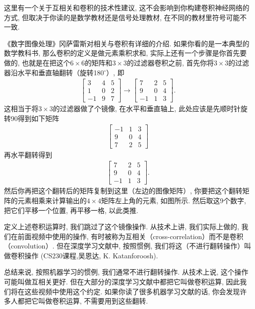 这里有一个关于互相关和卷积的技术性建议, 这不会影响到你构建卷积神经网络的方式, 但取决于你读的是数学教材还是信号处理教材, 在不同的教材里符号可能不一致.
\begin{remark}
《数字图像处理》冈萨雷斯对相关与卷积有详细的介绍.
如果你看的是一本典型的数学教科书, 那么卷积的定义是做元素乘积求和, 实际上还有一个步骤是你首先要做的, 也就是在把这个$6\times 6$的矩阵和$3\times 3$的过滤器卷积之前,
首先你将$3\times 3$的过滤器沿水平和垂直轴翻转（旋转180$^\circ$）, 即
\begin{align*}
\left[\begin{array}{ccc}
3 & 4 & 5 \\
1 & 0 & 2 \\
-1 & 9 & 7
\end{array}\right]\rightarrow\left[\begin{array}{crr}
7 & 2 & 5 \\
9 & 0 & 4 \\
-1 & 1 & 3
\end{array}\right].
\end{align*}
这相当于将$3\times 3$的过滤器做了个镜像, 在水平和垂直轴上, 此处应该是先顺时针旋转90得到如下矩阵
\begin{align*}
\left[\begin{array}{ccc}
-1 & 1 & 3 \\
9 & 0 & 4 \\
7 & 2 & 5
\end{array}\right]
\end{align*}
再水平翻转得到
\begin{align*}
\left[\begin{array}{ccc}
7 & 2 & 5 \\
9 & 0 & 4 \\
-1 & 1 & 3
\end{array}\right].
\end{align*}
然后你再把这个翻转后的矩阵复制到这里（左边的图像矩阵）, 你要把这个翻转矩阵的元素相乘来计算输出的$4\times 4$矩阵左上角的元素,
如图所示. 然后取这9个数字, 把它们平移一个位置, 再平移一格, 以此类推.
\end{remark}
\begin{remark}
    定义上述卷积运算时, 我们跳过了这个镜像操作. 从技术上讲, 我们实际上做的, 我们在前面视频中使用的操作, 有时被称为互相关（cross-correlation）而不是卷积（convolution）. 但在深度学习文献中, 按照惯例, 我们将这（不进行翻转操作）叫做卷积操作 (CS230课程,吴恩达, K. Katanforoosh).
\end{remark}

总结来说, 按照机器学习的惯例, 我们通常不进行翻转操作. 从技术上说, 这个操作可能叫做互相关更好. 但在大部分的深度学习文献中都把它叫做卷积运算, 因此我们将在这些视频中使用这个约定. 如果你读了很多机器学习文献的话, 你会发现许多人都把它叫做卷积运算, 不需要用到这些翻转.

